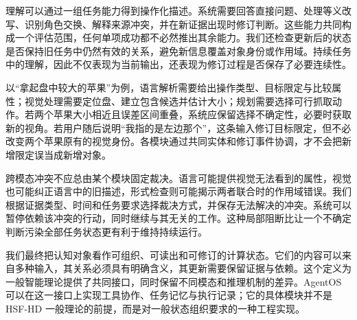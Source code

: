 理解可以通过一组任务能力得到操作化描述。系统需要回答直接问题、处理等义改写、识别角色交换、解释来源冲突，并在新证据出现时修订判断。这些能力共同构成一个评估范围，任何单项成功都不必然推出其余能力。我们还检查更新后的状态是否保持旧任务中仍然有效的关系，避免新信息覆盖对象身份或作用域。持续任务中的理解，因此不仅表现为当前输出，还表现为修订过程是否保存了必要连续性。

以“拿起盘中较大的苹果”为例，语言解析需要给出操作类型、目标限定与比较属性；视觉处理需要定位盘、建立包含候选并估计大小；规划需要选择可行抓取动作。若两个苹果大小相近且误差区间重叠，系统应保留选择不确定性，必要时获取新的视角。若用户随后说明“我指的是左边那个”，这条输入修订目标限定，但不必改变两个苹果原有的视觉身份。各模块通过共同实体和修订事件协调，才不会把新增限定误当成新增对象。

跨模态冲突不应总由某个模块固定裁决。语言可能提供视觉无法看到的属性，视觉也可能纠正语言中的旧描述，形式检查则可能揭示两者联合时的作用域错误。我们根据证据类型、时间和任务要求选择裁决方式，并保存无法解决的冲突。系统可以暂停依赖该冲突的行动，同时继续与其无关的工作。这种局部阻断比让一个不确定判断污染全部任务状态更有利于维持持续运行。

我们最终把认知对象看作可组织、可读出和可修订的计算状态。它们的内容可以来自多种输入，其关系必须具有明确含义，其更新需要保留证据与依赖。这个定义为一般智能理论提供了共同接口，同时保留不同模态和推理机制的差异。AgentOS 可以在这一接口上实现工具协作、任务记忆与执行记录；它的具体模块并不是 HSF-HD 一般理论的前提，而是对一般状态组织要求的一种工程实现。
